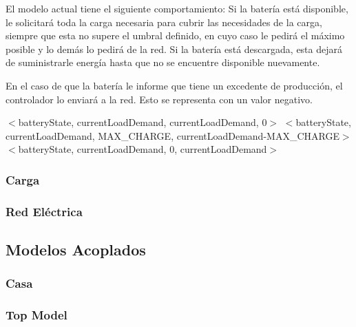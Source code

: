 El modelo actual tiene el siguiente comportamiento: Si la batería está disponible, le solicitará
toda la carga necesaria para cubrir las necesidades de la carga, siempre que esta no supere
el umbral definido, en cuyo caso le pedirá el máximo posible y lo demás lo pedirá de la red.
Si la batería está descargada, esta dejará de suministrarle energía hasta que no se encuentre
disponible nuevamente.

En el caso de que la batería le informe que tiene un excedente de producción, el controlador
lo enviará a la red. Esto se representa con un valor negativo.



\begin{algorithm}
    \caption{$UpdateGridConsuption(S)$}
    \begin{algorithmic}[H]
                \RETURN $<$batteryState, currentLoadDemand, currentLoadDemand, 0$>$
            \ELSE
                \RETURN $<$batteryState, currentLoadDemand, MAX\_CHARGE, currentLoadDemand-MAX\_CHARGE$>$
            \ENDIF
        \ELSE
            \RETURN $<$batteryState, currentLoadDemand, 0, currentLoadDemand$>$
        \ENDIF
    \end{algorithmic}
\end{algorithm}


\subsubsection{Carga}
\subsubsection{Red Eléctrica}

\subsection{Modelos Acoplados}

\subsubsection{Casa}
\subsubsection{Top Model}